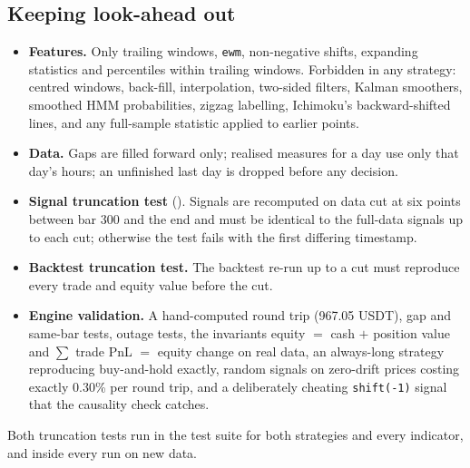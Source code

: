 \documentclass[11pt,a4paper]{article}
\newcommand{\repo}{https://github.com/PriyanshuIITGHY2006/InterIIT_Quant_Jain-Streeter}
\newcommand{\file}[1]{\href{\repo/blob/master/#1}{\texttt{\detokenize{#1}}}}
\theoremstyle{definition}
\begin{document}
\subsection{Keeping look-ahead out}
\begin{itemize}
\item \textbf{Features.} Only trailing windows, \texttt{ewm}, non-negative shifts, expanding statistics and percentiles within trailing windows. Forbidden in any strategy: centred windows, back-fill, interpolation, two-sided filters, Kalman smoothers, smoothed HMM probabilities, zigzag labelling, Ichimoku's backward-shifted lines, and any full-sample statistic applied to earlier points.
\item \textbf{Data.} Gaps are filled forward only; realised measures for a day use only that day's hours; an unfinished last day is dropped before any decision.
\item \textbf{Signal truncation test} (\file{src/backtest/checks.py}). Signals are recomputed on data cut at six points between bar 300 and the end and must be identical to the full-data signals up to each cut; otherwise the test fails with the first differing timestamp.
\item \textbf{Backtest truncation test.} The backtest re-run up to a cut must reproduce every trade and equity value before the cut.
\item \textbf{Engine validation.} A hand-computed round trip (967.05 USDT), gap and same-bar tests, outage tests, the invariants equity $=$ cash $+$ position value and $\sum$ trade PnL $=$ equity change on real data, an always-long strategy reproducing buy-and-hold exactly, random signals on zero-drift prices costing exactly 0.30\% per round trip, and a deliberately cheating \texttt{shift(-1)} signal that the causality check catches.
\end{itemize}
Both truncation tests run in the test suite for both strategies and every indicator, and inside every run on new data.

\end{document}

